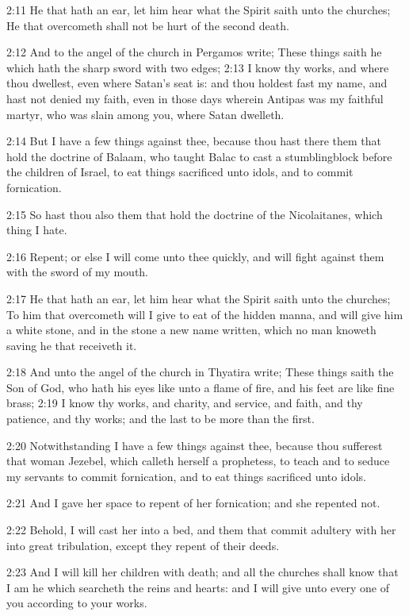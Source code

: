 2:11 He that hath an ear, let him hear what the Spirit saith unto the churches; He that overcometh shall not be hurt of the second death.

2:12 And to the angel of the church in Pergamos write; These things saith he which hath the sharp sword with two edges; 2:13 I know thy works, and where thou dwellest, even where Satan's seat is: and thou holdest fast my name, and hast not denied my faith, even in those days wherein Antipas was my faithful martyr, who was slain among you, where Satan dwelleth.

2:14 But I have a few things against thee, because thou hast there them that hold the doctrine of Balaam, who taught Balac to cast a stumblingblock before the children of Israel, to eat things sacrificed unto idols, and to commit fornication.

2:15 So hast thou also them that hold the doctrine of the Nicolaitanes, which thing I hate.

2:16 Repent; or else I will come unto thee quickly, and will fight against them with the sword of my mouth.

2:17 He that hath an ear, let him hear what the Spirit saith unto the churches; To him that overcometh will I give to eat of the hidden manna, and will give him a white stone, and in the stone a new name written, which no man knoweth saving he that receiveth it.

2:18 And unto the angel of the church in Thyatira write; These things saith the Son of God, who hath his eyes like unto a flame of fire, and his feet are like fine brass; 2:19 I know thy works, and charity, and service, and faith, and thy patience, and thy works; and the last to be more than the first.

2:20 Notwithstanding I have a few things against thee, because thou sufferest that woman Jezebel, which calleth herself a prophetess, to teach and to seduce my servants to commit fornication, and to eat things sacrificed unto idols.

2:21 And I gave her space to repent of her fornication; and she repented not.

2:22 Behold, I will cast her into a bed, and them that commit adultery with her into great tribulation, except they repent of their deeds.

2:23 And I will kill her children with death; and all the churches shall know that I am he which searcheth the reins and hearts: and I will give unto every one of you according to your works.

